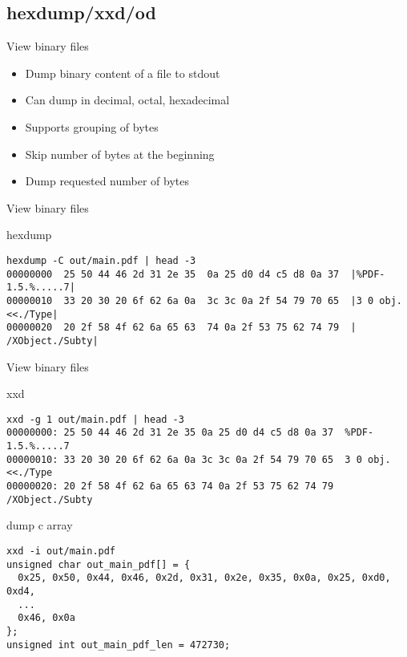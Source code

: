 \subsection{hexdump/xxd/od}

\begin{frame}[fragile]{View binary files}
  \begin{itemize}
    \pause \item Dump binary content of a file to stdout
    \pause \item Can dump in decimal, octal, hexadecimal
    \pause \item Supports grouping of bytes
    \pause \item Skip number of bytes at the beginning
    \pause \item Dump requested number of bytes
  \end{itemize}
\end{frame}

\begin{frame}[fragile]{View binary files}
  \begin{exampleblock}{hexdump}
    \begin{lstlisting}[showstringspaces=false,basicstyle=\tiny]
hexdump -C out/main.pdf | head -3
00000000  25 50 44 46 2d 31 2e 35  0a 25 d0 d4 c5 d8 0a 37  |%PDF-1.5.%.....7|
00000010  33 20 30 20 6f 62 6a 0a  3c 3c 0a 2f 54 79 70 65  |3 0 obj.<<./Type|
00000020  20 2f 58 4f 62 6a 65 63  74 0a 2f 53 75 62 74 79  | /XObject./Subty|
    \end{lstlisting}
  \end{exampleblock}
\end{frame}

\begin{frame}[fragile]{View binary files}
  \begin{exampleblock}{xxd}
    \begin{lstlisting}[showstringspaces=false,basicstyle=\tiny]
xxd -g 1 out/main.pdf | head -3
00000000: 25 50 44 46 2d 31 2e 35 0a 25 d0 d4 c5 d8 0a 37  %PDF-1.5.%.....7
00000010: 33 20 30 20 6f 62 6a 0a 3c 3c 0a 2f 54 79 70 65  3 0 obj.<<./Type
00000020: 20 2f 58 4f 62 6a 65 63 74 0a 2f 53 75 62 74 79   /XObject./Subty
    \end{lstlisting}
  \end{exampleblock}
  \pause
  \begin{exampleblock}{dump c array}
    \begin{lstlisting}[showstringspaces=false,basicstyle=\tiny]
xxd -i out/main.pdf
unsigned char out_main_pdf[] = {
  0x25, 0x50, 0x44, 0x46, 0x2d, 0x31, 0x2e, 0x35, 0x0a, 0x25, 0xd0, 0xd4,
  ...
  0x46, 0x0a
};
unsigned int out_main_pdf_len = 472730;
    \end{lstlisting}
  \end{exampleblock}
\end{frame}

